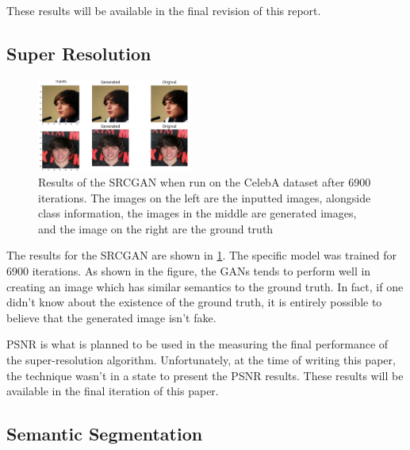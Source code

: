 These results will be available in the final revision of this report.

\subsection{Super Resolution}

\begin{figure}
	\centering
	\includegraphics[width=0.45\textwidth]{images/gan-res.png}
	\caption{Results of the SRCGAN when run on the CelebA dataset after 6900
	iterations. The images on the left are the inputted images, alongside class
	information, the images in the middle are generated images, and the image on
	the right are the ground truth}
	\label{fig:gan-res}
\end{figure}

The results for the SRCGAN are shown in \ref{fig:gan-res}. The specific model was
trained for 6900 iterations. As shown in the figure, the GANs tends to perform
well in creating an image which has similar semantics to the ground truth. In
fact, if one didn’t know about the existence of the ground truth, it is entirely
possible to believe that the generated image isn’t fake.

PSNR is what is planned to be used in the measuring the final performance of the
super-resolution algorithm. Unfortunately, at the time of writing this paper,
the technique wasn’t in a state to present the PSNR results. These results will
be available in the final iteration of this paper.

\subsection{Semantic Segmentation}

